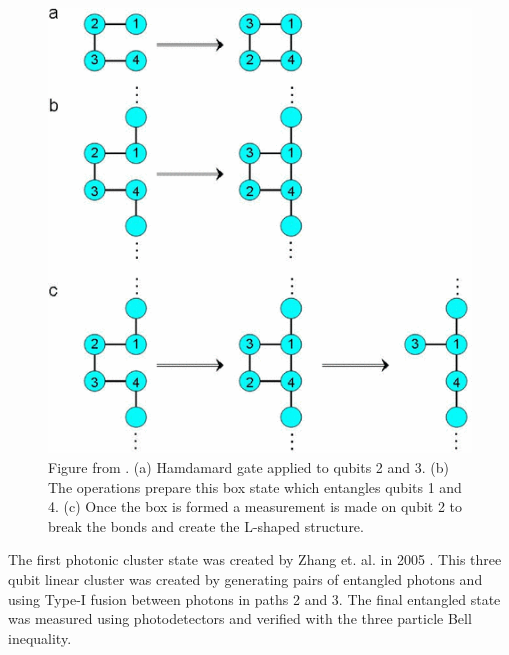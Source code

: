 \documentclass[twocolumn]{Styles/IEEEtran11}
\begin{document}
   \begin{figure}[h]
    \centering
     \includegraphics[width=0.9\linewidth]{Images/lshaped.png}
     \caption{Figure from \protect\cite{gerald2006efficient}. (a) Hamdamard gate applied to qubits 2 and 3. (b) The operations prepare this box state which entangles qubits 1 and 4. (c) Once the box is formed a measurement is made on qubit 2 to break the bonds and create the L-shaped structure.}
   \end{figure}
   
The first photonic cluster state was created by Zhang et. al. in 2005 \cite{zhang2006experimental}. This three qubit linear cluster was created by generating pairs of entangled photons and using Type-I fusion between photons in paths 2 and 3. The final entangled state was measured using photodetectors and verified with the three particle Bell inequality. 
\end{document}
